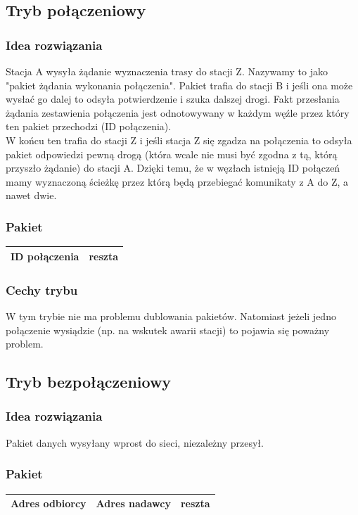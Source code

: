 \documentclass[a4paper,twoside]{article}
\begin{document}
		\subsection{Tryb połączeniowy}
			\subsubsection{Idea rozwiązania}
				Stacja A wysyła żądanie wyznaczenia trasy do stacji Z. Nazywamy to jako "pakiet żądania wykonania połączenia". Pakiet trafia do stacji B i jeśli ona może wysłać go dalej to odsyła potwierdzenie i szuka dalszej drogi. Fakt przesłania żądania zestawienia połączenia jest odnotowywany w każdym węźle przez który ten pakiet przechodzi (ID połączenia).\\
				W końcu ten trafia do stacji Z i jeśli stacja Z się zgadza na połączenia to odsyła pakiet odpowiedzi pewną drogą (która wcale nie musi być zgodna z tą, którą przyszło żądanie) do stacji A. Dzięki temu, że w węzłach istnieją ID połączeń mamy wyznaczoną ścieżkę przez którą będą przebiegać komunikaty z A do Z, a nawet dwie.
			\subsubsection{Pakiet}
				\begin{tabular}{|c|c|}
					\hline ID połączenia & reszta \\
					\hline 
				\end{tabular}
			\subsubsection{Cechy trybu}
				W tym trybie nie ma problemu dublowania pakietów. Natomiast jeżeli jedno połączenie wysiądzie (np. na wskutek awarii stacji) to pojawia się poważny problem.
		\subsection{Tryb bezpołączeniowy}
			\subsubsection{Idea rozwiązania}
				Pakiet danych wysyłany wprost do sieci, niezależny przesył.
			\subsubsection{Pakiet}
				\begin{tabular}{|c|c|c|}
					\hline Adres odbiorcy & Adres nadawcy & reszta \\ 
					\hline 
				\end{tabular}
\end{document}
